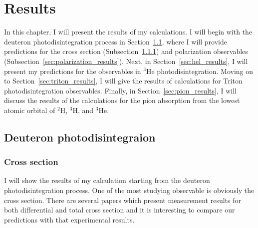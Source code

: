 \chapter{Results}\label{chap:results}

    In this chapter, I will present the results of my calculations. I will begin with the deuteron photodisintegration process in Section~\ref{sec:de_results}, where I will provide predictions for the cross section (Subsection~\ref{sec:cross_results}) and polarization observables (Subsection~\ref{sec:polarization_results}).
    Next, in Section~\ref{sec:hel_results}, I will present my predictions for 
    the observables in $^3$He photodisintegration.
    Moving on to Section~\ref{sec:triton_results}, I will give the results of calculations for
    Triton photodisintegration observables.
    Finally, in Section~\ref{sec:pion_results}, I will discuss the results of the calculations for
    the pion absorption from the lowest atomic orbital of $^2$H, $^3$H, and $^3$He.

\section{Deuteron photodisintegraion}
\label{sec:de_results}
    \subsection{Cross section}
    \label{sec:cross_results}

    I will show the results of my calculation starting from the
    deuteron photodisintegration process. One of the most
    studying observable is obviously the cross section. There are
    several papers which present 
    measurement results for both differential and total cross section
    \cite{BOSMAN1979,ARENDS1984,Skopik1974, Moreh1989, Birenbaum1985, Bernabei1986, rachek2007,Ying_Experiment_Deut, DeSanctis_Experiment_Deut} 
    and it is interesting to compare 
    our predictions with that experimental results.


